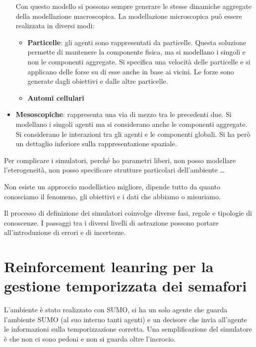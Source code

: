 \begin{itemize}
            Con questo modello si possono sempre generare le stesse dinamiche
            aggregate della modellazione macroscopica. La modellazione
            microscopica può essere realizzata in diversi modi:
            \begin{itemize}
                  \item \textbf{Particelle}: gli agenti sono rappresentati da
                        particelle. Questa soluzione permette di mantenere la
                        componente fisica, ma si modellano i singoli e non le
                        componenti aggregate. Si specifica una velocità delle
                        particelle e si applicano delle forse su di esse anche in
                        base ai vicini. Le forze sono generate dagli obiettivi e dalle
                        altre particelle.
                  \item \textbf{Automi cellulari}
            \end{itemize}
      \item \textbf{Mesoscopiche}: rappresenta una via di mezzo tra le precedenti
            due. Si modellano i singoli agenti ma si considerano anche le componenti
            aggregate. Si considerano le interazioni tra gli agenti e le componenti
            globali. Si ha però un dettaglio inferiore sulla rappresentazione
            spaziale.
\end{itemize}
Per complicare i simulatori, perché ho parametri liberi, non posso modellare
l'eterogeneità, non posso specificare strutture particolari dell'ambiente \dots
\begin{nota}
      Non esiste un approccio modellistico migliore, dipende tutto da quanto
      conosciamo il fenomeno, gli obiettivi e i dati che abbiamo o misuriamo.
\end{nota}
Il processo di definizione dei simulatori coinvolge diverse fasi, regole e
tipologie di conoscenze. I passaggi tra i diversi livelli di astrazione possono
portare all'introduzione di errori e di incertezze.

\section{Reinforcement leanring per la gestione temporizzata dei semafori}
L'ambiente è stato realizzato con SUMO, si ha un solo agente che guarda l'ambiente 
SUMO (al suo interno tanti agenti) e un decisore che invia all'agente le informazioni 
sulla temporizzazione corretta. Una semplificazione del simulatore è che non ci sono 
pedoni e non si guarda oltre l'incrocio.


